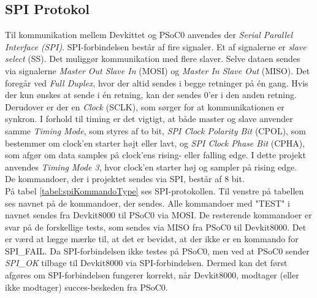 \subsection{SPI Protokol}
\label{afsnit:spiprotokol}
Til kommunikation mellem Devkittet og PSoC0 anvendes der \textit{Serial Parallel Interface (SPI)}. SPI-forbindelsen består af fire signaler. Et af signalerne er \textit{slave select} (SS). Det muliggør kommunikation med flere slaver. Selve dataen sendes via signalerne \textit{Master Out Slave In} (MOSI) og \textit{Master In Slave Out} (MISO). Det foregår ved \textit{Full Duplex}, hvor der altid sendes i begge retninger på én gang. Hvis der kun ønskes at sende i én retning, kan der sendes 0'er i den anden retning. Derudover er der en \textit{Clock} (SCLK), som sørger for at kommunikationen er synkron. I forhold til timing er det vigtigt, at både master og slave anvender samme \textit{Timing Mode}, som styres af to bit, \textit{SPI Clock Polarity Bit} (CPOL), som bestemmer om clock'en starter højt eller lavt, og \textit{SPI Clock Phase Bit} (CPHA), som afgør om data samples på clock'ens rising- eller falling edge. I dette projekt anvendes \textit{Timing Mode 3}, hvor clock'en starter høj og sampler på rising edge. \\
De kommandoer, der i projektet sendes via SPI, består af 8 bit. \\
På tabel \ref{tabel:spiKommandoType} ses SPI-protokollen. Til venstre på tabellen ses navnet på de kommandoer, der sendes. Alle kommandoer med "TEST" i navnet sendes fra Devkit8000 til PSoC0 via MOSI. De resterende kommandoer er svar på de forskellige tests, som sendes via MISO fra PSoC0 til Devkit8000. Det er værd at lægge mærke til, at det er bevidst, at der ikke er en kommando for SPI\_FAIL. Da SPI-forbindelsen ikke testes på PSoC0, men ved at PSoC0 sender \textit{SPI\_OK} tilbage til Devkit8000 via SPI-forbindelsen. Dermed kan det først afgøres om SPI-forbindelsen fungerer korrekt, når Devkit8000, modtager (eller ikke modtager) succes-beskeden fra PSoC0. \\



